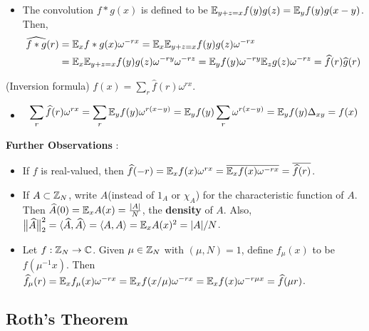 \documentclass[10pt,a4paper]{report}
\renewcommand{\hat}{\widehat}
\begin{document}
\begin{itemize}
\item[ ]\pf The convolution $f*g(x)$ is defined to be $\mathbb{E}_{y+z =x} f(y) g(z) = \mathbb{E}_y f(y)g(x-y)$. Then,
\begin{align*}
\hat{f * g}(r) &= \avg_x f*g(x) \omega^{-rx} = \avg_x \avg_{y+z =x} f(y) g(z) \omega^{-rx} \\
&= \avg_x \avg_{y+z=x} f(y) g(z) \omega^{-ry}\omega^{-rz} = \avg_y f(y) \omega^{-ry} \avg_{z} g(z) \omega^{-rz} = \hat{f}(r) \hat{g}(r)
\end{align*}
\eop
\end{itemize} 
\s

(Inversion formula)  $f(x) = \sum_{r} \hat{f}(r)\omega^{rx}$.
\begin{itemize}
\item[ ] \pf
\begin{align*}
\sum_{r} \hat{f}(r) \omega^{rx} = \sum_r \avg_y f(y) \omega^{r(x-y)} = \avg_y f(y) \sum_r \omega^{r(x-y)} = \avg_y f(y) \Delta_{xy}  = f(x)
\end{align*}
\eop

\end{itemize}
\s

\textbf{Further Observations} :

\begin{itemize}
\item If $f$ is real-valued, then $\hat{f}(-r) = \avg_x f(x) \omega^{rx} = \bar{\avg_x f(x) \omega^{-rx}} = \overline{ \hat{f}(r) }$.

\item If $A\subset \mathbb{Z}_N$, write $A$(instead of $1_A$ or $\chi_A$) for the characteristic function of $A$. Then $\hat{A}(0) = \avg_x A(x) = \frac{|A|}{N}$, the \textbf{density} of $A$. Also, $\norms{\hat{A}}{2}^2 = \langle \hat{A}, \hat{A} \rangle = \langle A,A \rangle = \avg_x A(x)^2 = |A|/N$.

\item Let $f: \mathbb{Z}_N \rightarrow \mathbb{C}$. Given $\mu \in \mathbb{Z}_N$ with $(\mu, N)=1$, define $f_{\mu}(x)$ to be $f(\mu^{-1}x)$. Then $\hat{f}_{\mu}(r) = \avg_x f_{\mu}(x)\omega^{-rx} = \avg_x f(x/\mu) \omega^{-rx} = \avg_x f(x)\omega^{-r\mu x} = \hat{f}(\mu r)$.
\end{itemize}

\subsection*{Roth's Theorem}
\s
\end{document}
